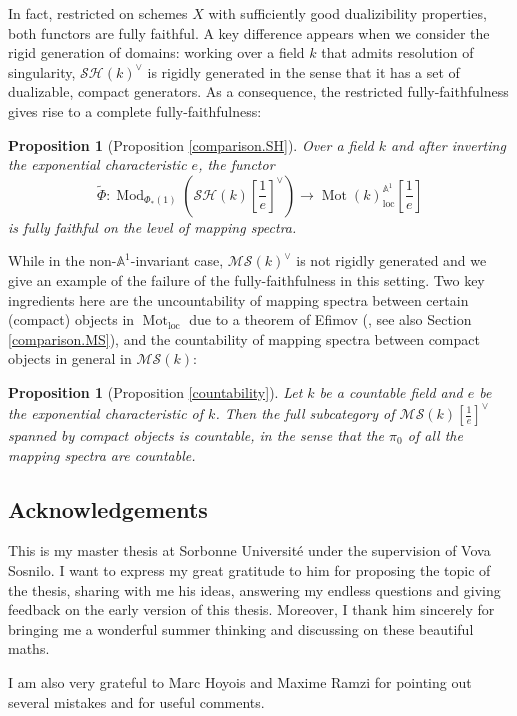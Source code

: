 \documentclass{article}
\newtheorem{prop}[thm]{Proposition}
\theoremstyle{definition}
\newcommand{\on}{\operatorname}
\begin{document}
In fact, restricted on schemes $X$ with sufficiently good dualizibility properties, both functors are fully faithful. A key difference appears when we consider the rigid generation of domains: working over a field $k$ that admits resolution of singularity, $\mathcal{SH}(k)^\vee$ is rigidly generated in the sense that it has a set of dualizable, compact generators. As a consequence, the restricted fully-faithfulness gives rise to a complete fully-faithfulness:
\begin{prop}[Proposition \ref{comparison.SH}]
Over a field $k$ and after inverting the exponential characteristic $e$, the functor\[
\widetilde{\Phi}:\on{Mod}_{\Phi_\ast(1)}(\mathcal{SH}(k)[\frac{1}{e}]^\vee)\rightarrow\on{Mot}(k)^{\mathbb{A}^1}_{\on{loc}}[\frac{1}{e}]
\]
is fully faithful on the level of mapping spectra.
\end{prop}
While in the non-$\mathbb{A}^1$-invariant case, $\mathcal{MS}(k)^\vee$ is not rigidly generated and we give an example of the failure of the fully-faithfulness in this setting. Two key ingredients here are the uncountability of mapping spectra between certain (compact) objects in $\on{Mot}_{\on{loc}}$ due to a theorem of Efimov (\cite[Theorem 9.1]{Efi25}, see also Section \ref{comparison.MS}), and the countability of mapping spectra between compact objects in general in $\mathcal{MS}(k)$:
\begin{prop}[Proposition \ref{countability}]
Let $k$ be a countable field and $e$ be the exponential characteristic of $k$. Then the full subcategory of $\mathcal{MS}(k)[\frac{1}{e}]^\vee$ spanned by compact objects is countable, in the sense that the $\pi_0$ of all the mapping spectra are countable.
\end{prop}





\subsection{Acknowledgements}
This is my master thesis at Sorbonne Université under the supervision of Vova Sosnilo. I want to express my great gratitude to him for proposing the topic of the thesis, sharing with me his ideas, answering my endless questions and giving feedback on the early version of this thesis. Moreover, I thank him sincerely for bringing me a wonderful summer thinking and discussing on these beautiful maths.


I am also very grateful to Marc Hoyois and Maxime Ramzi for pointing out several mistakes and for useful comments.
\end{document}

